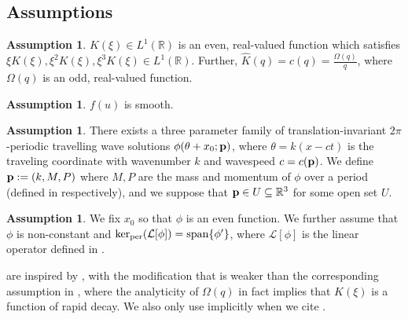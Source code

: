 \documentclass[11pt,leqno]{article}
\numberwithin{equation}{section}
\newcommand{\R}{\mathbb R}
\newcommand{\Span}{{\rm span}}
\theoremstyle{definition}
\newtheorem{assumption}[theorem]{Assumption}
\begin{document}
\subsection*{Assumptions}
\begin{assumption}
	$ K(\xi) \in L^{1}(\R)$ is an even, real-valued function which satisfies $ \xi K(\xi), \xi^{2}K(\xi),  \xi^{3}K(\xi) \in L^{1}(\R)$. Further, $ \widehat{K}(q) = c(q) = \frac{\Omega(q)}{q} $, where $ \Omega(q) $ is an odd, real-valued function. \label{assumption:a1}
\end{assumption}
\begin{assumption}
	\label{assumption:a2}  $f(u)$ is smooth.
\end{assumption}
\begin{assumption}
	\label{assumption:a3}  There exists a three parameter family of translation-invariant $2\pi$-periodic travelling wave solutions $\phi(\theta + x_0;{\bf p})$, where $\theta=k(x -ct)$ is the traveling coordinate with wavenumber $k$ and wavespeed $c=c({\bf p})$. We define ${\bf p} := (k, M, P)$ where $ M,P $ are the mass and momentum of $ \phi $ over a period (defined in  respectively), and we suppose that $ {\bf p} \in U\subseteq \R^3$ for some open set $ U $. 
\end{assumption}
\begin{assumption}\label{assumption:a4}We fix $x_0$ so that $\phi$ is an even function. We further assume that $ \phi $ is non-constant and $\ker_{\rm per}(\mathcal{L}[\phi]) = \Span\{\phi'\}$, where $ \mathcal{L}[\phi] $ is the linear operator defined in .
\end{assumption}

 are inspired by \cite{BIHS2021}, with the modification that  is weaker than the corresponding assumption in \cite{BIHS2021}, where the analyticity of $ \Omega(q) $ in fact implies that $ K(\xi) $ is a function of rapid decay. We also only use  implicitly when we cite \cite{BIHS2021}.
\end{document}
